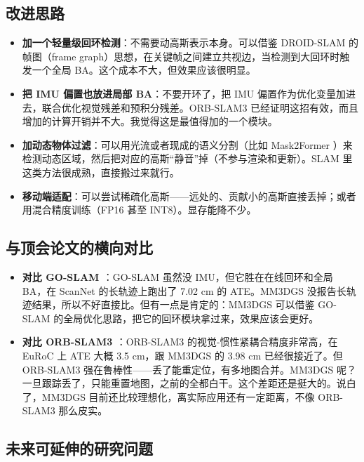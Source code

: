 \documentclass[12pt,a4paper,onecolumn]{article}
\begin{document}
\subsection{改进思路}

\begin{itemize}
    \item \textbf{加一个轻量级回环检测}：不需要动高斯表示本身。可以借鉴 DROID-SLAM \cite{DROID-SLAM} 的帧图（frame graph）思想，在关键帧之间建立共视边，当检测到大回环时触发一个全局 BA。这个成本不大，但效果应该很明显。

    \item \textbf{把 IMU 偏置也放进局部 BA}：不要开环了，把 IMU 偏置作为优化变量加进去，联合优化视觉残差和预积分残差。ORB-SLAM3 \cite{ORB-SLAM3} 已经证明这招有效，而且增加的计算开销并不大。我觉得这是最值得加的一个模块。

    \item \textbf{加动态物体过滤}：可以用光流或者现成的语义分割（比如 Mask2Former \cite{Mask2Former}）来检测动态区域，然后把对应的高斯“静音”掉（不参与渲染和更新）。SLAM 里这类方法很成熟，直接搬过来就行。

    \item \textbf{移动端适配}：可以尝试稀疏化高斯——远处的、贡献小的高斯直接丢掉；或者用混合精度训练（FP16 甚至 INT8）。显存能降不少。
\end{itemize}

\subsection{与顶会论文的横向对比}

\begin{itemize}
    \item \textbf{对比 GO-SLAM \cite{GO-SLAM}}：GO-SLAM 虽然没 IMU，但它胜在在线回环和全局 BA，在 ScanNet 的长轨迹上跑出了 7.02 cm 的 ATE。MM3DGS 没报告长轨迹结果，所以不好直接比。但有一点是肯定的：MM3DGS 可以借鉴 GO-SLAM 的全局优化思路，把它的回环模块拿过来，效果应该会更好。

    \item \textbf{对比 ORB-SLAM3 \cite{ORB-SLAM3}}：ORB-SLAM3 的视觉-惯性紧耦合精度非常高，在 EuRoC 上 ATE 大概 3.5 cm，跟 MM3DGS 的 3.98 cm 已经很接近了。但 ORB-SLAM3 强在鲁棒性——丢了能重定位，有多地图合并。MM3DGS 呢？一旦跟踪丢了，只能重置地图，之前的全都白干。这个差距还是挺大的。说白了，MM3DGS 目前还比较理想化，离实际应用还有一定距离，不像 ORB-SLAM3 那么皮实。
\end{itemize}

\subsection{未来可延伸的研究问题}
\end{document}
